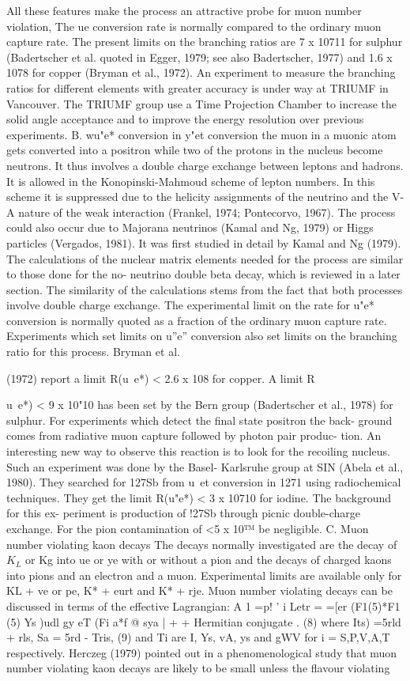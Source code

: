 \documentclass[twoside]{article}
\begin{document}
{{{{{{{{{All these features make the process an attractive probe for muon number
violation,
The ue conversion rate is normally compared to the ordinary muon
capture rate. The present limits on the branching ratios are 7 x 10711
for sulphur (Badertscher et al. quoted in Egger, 1979; see also
Badertscher, 1977) and 1.6 x 1078 for copper (Bryman et al., 1972). An
experiment to measure the branching ratios for different elements with
greater accuracy is under way at TRIUMF in Vancouver. The TRIUMF group
use a Time Projection Chamber to increase the solid angle acceptance and
to improve the energy resolution over previous experiments.
B. wu"e* conversion
in y"et conversion the muon in a muonic atom gets converted into a
positron while two of the protons in the nucleus become neutrons. It
thus involves a double charge exchange between leptons and hadrons. It
is allowed in the Konopinski-Mahmoud scheme of lepton numbers. In this
scheme it is suppressed due to the helicity assignments of the neutrino
and the V-A nature of the weak interaction (Frankel, 1974; Pontecorvo,
1967). The process could also occur due to Majorana neutrinos (Kamal
and Ng, 1979) or Higgs particles (Vergados, 1981). It was first studied
in detail by Kamal and Ng (1979). The calculations of the nuclear matrix
elements needed for the process are similar to those done for the no-
neutrino double beta decay, which is reviewed in a later section. The
similarity of the calculations stems from the fact that both processes
involve double charge exchange. The experimental limit on the rate
for u"e* conversion is normally quoted as a fraction of the ordinary
muon capture rate. Experiments which set limits on u”e” conversion
also set limits on the branching ratio for this process. Bryman et al.

(1972) report a limit R(u~e*) < 2.6 x 108 for copper. A limit R{u~e*) <
9 x 10"10 has been set by the Bern group (Badertscher et al., 1978) for
sulphur. For experiments which detect the final state positron the back-
ground comes from radiative muon capture followed by photon pair produc-
tion. An interesting new way to observe this reaction is to look for
the recoiling nucleus. Such an experiment was done by the Basel-
Karlsruhe group at SIN (Abela et al., 1980). They searched for 127Sb
from u~et conversion in 1271 using radiochemical techniques. They get
the limit R(u"e*) < 3 x 10710 for iodine. The background for this ex-
periment is production of !27Sb through picnic double-charge exchange.
For the pion contamination of <5 x 10™%
be negligible.
C. Muon number violating kaon decays
The decays normally investigated are the decay of $K_L$ or Kg into ue
or ye with or without a pion and the decays of charged kaons into pions
and an electron and a muon. Experimental limits are available only for
KL + ve or pe, K* + eurt and K* + rje. Muon number violating decays
can be discussed in terms of the effective Lagrangian:
A 1 =p! ' i
Letr = =[er (F1(5)*F1 (5) Ys )udl gy eT (Fi a*f @ sya | +
+ Hermitian conjugate . (8)
where
Its) =5rld + rls,
Sa = 5rd - Tris, (9)
and Ti are I, Ys, vA, ys and gWV for i = S,P,V,A,T respectively.
Herczeg (1979) pointed out in a phenomenological study that muon number
violating kaon decays are likely to be small unless the flavour violating

}}}}}}}}}}
\end{document}
